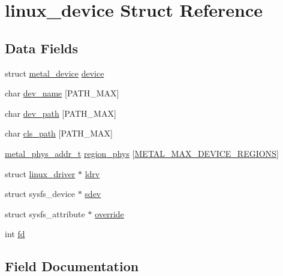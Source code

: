 \hypertarget{structlinux__device}{}\section{linux\+\_\+device Struct Reference}
\label{structlinux__device}
\subsection*{Data Fields}
\begin{DoxyCompactItemize}
\item 
struct \hyperlink{structmetal__device}{metal\+\_\+device} \hyperlink{structlinux__device_a44b3d7530b379636674bf7472980f6f4}{device}
\item 
char \hyperlink{structlinux__device_a4ca324c2868041b5ad3e2ff9afe35694}{dev\+\_\+name} \mbox{[}P\+A\+T\+H\+\_\+\+M\+AX\mbox{]}
\item 
char \hyperlink{structlinux__device_a6bd4e1bd76c6b85bf66e2d8ad0f1a178}{dev\+\_\+path} \mbox{[}P\+A\+T\+H\+\_\+\+M\+AX\mbox{]}
\item 
char \hyperlink{structlinux__device_aa90d44d9691dc7aa83164445cccbc30a}{cls\+\_\+path} \mbox{[}P\+A\+T\+H\+\_\+\+M\+AX\mbox{]}
\item 
\hyperlink{group__system_gae024fa10b72199a3e26c29b6eb97df5d}{metal\+\_\+phys\+\_\+addr\+\_\+t} \hyperlink{structlinux__device_a2f8e2d069a9703f4e7a7f3073e8d9df2}{region\+\_\+phys} \mbox{[}\hyperlink{system_2zephyr_2sys_8h_ade1e205242a3d9e8ec25535d263aa664}{M\+E\+T\+A\+L\+\_\+\+M\+A\+X\+\_\+\+D\+E\+V\+I\+C\+E\+\_\+\+R\+E\+G\+I\+O\+NS}\mbox{]}
\item 
struct \hyperlink{structlinux__driver}{linux\+\_\+driver} $\ast$ \hyperlink{structlinux__device_ae2c25385fa957c66ac9b1fbd9cba95a2}{ldrv}
\item 
struct sysfs\+\_\+device $\ast$ \hyperlink{structlinux__device_a47abb7026acf68a8de75135e2a08fc21}{sdev}
\item 
struct sysfs\+\_\+attribute $\ast$ \hyperlink{structlinux__device_a46d8713f354d53cfab2fe99eb10cb026}{override}
\item 
int \hyperlink{structlinux__device_a495bc112899124ad709ff966277573de}{fd}
\end{DoxyCompactItemize}


\subsection{Field Documentation}
\mbox{\label{structlinux__device_aa90d44d9691dc7aa83164445cccbc30a}} 
